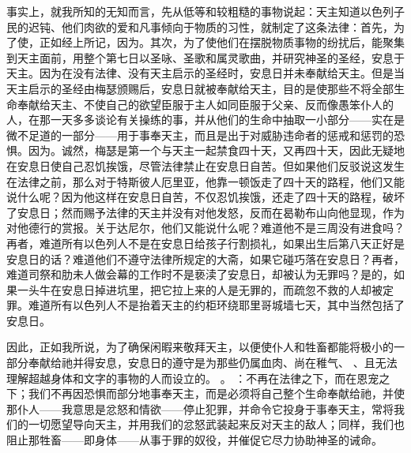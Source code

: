 事实上，就我所知的无知而言，先从低等和较粗糙的事物说起：天主知道以色列子民的迟钝、他们肉欲的爱和凡事倾向于物质的习性，就制定了这条法律：首先，为了使，正如经上所记，因为。其次，为了使他们在摆脱物质事物的纷扰后，能聚集到天主面前，用整个第七日以圣咏、圣歌和属灵歌曲，并研究神圣的圣经，安息于天主。因为在没有法律、没有天主启示的圣经时，安息日并未奉献给天主。但是当天主启示的圣经由梅瑟颁赐后，安息日就被奉献给天主，目的是使那些不将全部生命奉献给天主、不使自己的欲望臣服于主人如同臣服于父亲、反而像愚笨仆人的人，在那一天多多谈论有关操练的事，并从他们的生命中抽取一小部分——实在是微不足道的一部分——用于事奉天主，而且是出于对威胁违命者的惩戒和惩罚的恐惧。因为。诚然，梅瑟是第一个与天主一起禁食四十天，又再四十天，因此无疑地在安息日使自己忍饥挨饿，尽管法律禁止在安息日自苦。但如果他们反驳说这发生在法律之前，那么对于特斯彼人厄里亚，他靠一顿饭走了四十天的路程，他们又能说什么呢？因为他这样在安息日自苦，不仅忍饥挨饿，还走了四十天的路程，破坏了安息日；然而赐予法律的天主并没有对他发怒，反而在曷勒布山向他显现，作为对他德行的赏报。关于达尼尔，他们又能说什么呢？难道他不是三周没有进食吗？再者，难道所有以色列人不是在安息日给孩子行割损礼，如果出生后第八天正好是安息日的话？难道他们不遵守法律所规定的大斋，如果它碰巧落在安息日？再者，难道司祭和肋未人做会幕的工作时不是亵渎了安息日，却被认为无罪吗？是的，如果一头牛在安息日掉进坑里，把它拉上来的人是无罪的，而疏忽不救的人却被定罪。难道所有以色列人不是抬着天主的约柜环绕耶里哥城墙七天，其中当然包括了安息日。\par

因此，正如我所说，为了确保闲暇来敬拜天主，以便使仆人和牲畜都能将极小的一部分奉献给祂并得安息，安息日的遵守是为那些仍属血肉、尚在稚气、 、且无法理解超越身体和文字的事物的人而设立的。 。 ：不再在法律之下，而在恩宠之下；我们不再因恐惧而部分地事奉天主，而是必须将自己整个生命奉献给祂，并使那仆人——我意思是忿怒和情欲——停止犯罪，并命令它投身于事奉天主，常将我们的一切愿望导向天主，并用我们的忿怒武装起来反对天主的敌人；同样，我们也阻止那牲畜——即身体——从事于罪的奴役，并催促它尽力协助神圣的诫命。\par

